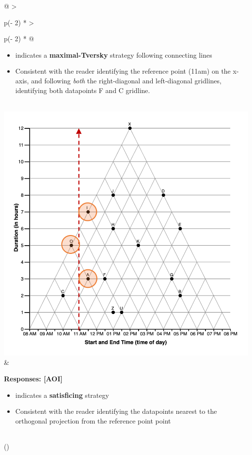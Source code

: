 \documentclass[
  letterpaper,
  DIV=11,
  numbers=noendperiod]{scrreprt}
\begin{document}
\begin{longtable}[]{@{}
  >{\raggedright\arraybackslash}p{(\columnwidth - 2\tabcolsep) * }
  >{\raggedright\arraybackslash}p{(\columnwidth - 2\tabcolsep) * }@{}}
\begin{minipage}[t]{\linewidth}
\begin{itemize}
\item
  indicates a \textbf{maximal-Tversky} strategy following connecting
  lines
\item
  Consistent with the reader identifying the reference point (11am) on
  the x-axis, and following \emph{both} the right-diagonal and
  left-diagonal gridlines, identifying both datapoints F and C gridline.
\end{itemize}
\end{minipage} \\
\includegraphics{analysis/SGC3A/static/interpretations/Q1_121_SATISFICE.png}
& \begin{minipage}[t]{\linewidth}\raggedright
\textbf{Responses: {[}AOI{]}}

\begin{itemize}
\item
  indicates a \textbf{satisficing} strategy
\item
  Consistent with the reader identifying the datapoints nearest to the
  orthogonal projection from the reference point point
\end{itemize}
\end{minipage} \\
\bottomrule()
\end{longtable}
\end{document}
